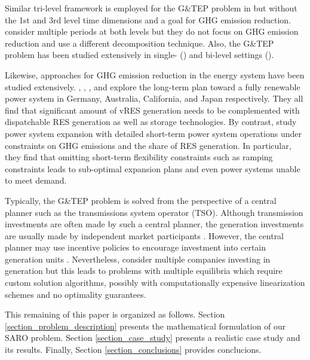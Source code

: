\documentclass[final]{IEEEtran}
\begin{document}

Similar tri-level framework is employed for the G\&TEP problem in \cite{Minquez, Moreira, Baringo2018} but without the 1st and 3rd level time dimensions and a goal for GHG emission reduction. \cite{Li, Roldan} consider multiple periods at both levels but they do not focus on GHG emission reduction and use a different decomposition technique. Also, the G\&TEP problem has been studied extensively in single- (\cite{Lopez, Dominguez, Munoz}) and bi-level settings (\cite{Zhang, Pisciella, Maurovich}).


Likewise, approaches for GHG emission reduction in the energy system have been studied extensively. \cite{Hansen}, \cite{Blakers}, \cite{Colbertaldo}, and \cite{Esteban} explore the long-term plan toward a fully renewable power system in Germany, Australia, California, and Japan respectively. They all find that significant amount of vRES generation needs to be complemented with dispatchable RES generation as well as storage technologies. By contrast, \cite{Chen, Palmintier} study power system expansion with detailed short-term power system operations under constraints on GHG emissions and the share of RES generation. In particular, they find that omitting short-term flexibility constraints such as ramping constraints leads to sub-optimal expansion plans and even power systems unable to meet demand.

Typically, the G&TEP problem is solved from the perspective of a central planner such as the transmissions system operator (TSO). Although transmission investments are often made by such a central planner, the generation investments are usually made by independent market participants \cite{Baringo2018}. However, the central planner may use incentive policies to encourage investment into certain generation units \cite{Zhou, Das}. Nevertheless, \cite{Jin, Roh, Pozo} consider multiple companies investing in generation but this leads to problems with multiple equilibria which require custom solution algorithms, possibly with computationally expensive linearization schemes and no optimality guarantees.





This remaining of this paper is organized as follows. Section \ref{section_problem_description} presents the mathematical formulation of our SARO problem. Section \ref{section_case_study} presents a realistic case study and its results. Finally, Section \ref{section_conclusions} provides conclucions.
\end{document}
